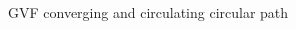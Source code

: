 \documentclass[conf]{new-aiaa}
\begin{document}
\begin{figure}[H]
	\begin{subfigmatrix}{2}%
		\centering	
		\hspace*{0mm}
	\end{subfigmatrix}
	\caption{GVF converging and circulating circular path}
	\label{fig:GVFLine}
\end{figure}

\end{document}
